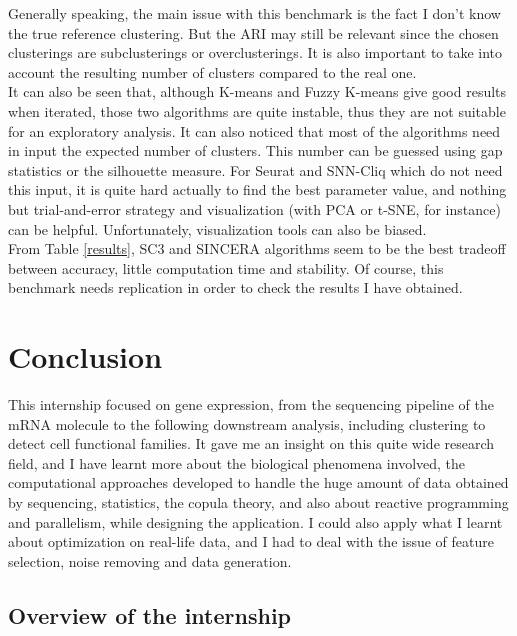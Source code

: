 \documentclass{report}
\begin{document}
Generally speaking, the main issue with this benchmark is the fact I don't know the true reference clustering. But the ARI may still be relevant since the chosen clusterings are subclusterings or overclusterings. It is also important to take into account the resulting number of clusters compared to the real one.\\

It can also be seen that, although K-means and Fuzzy K-means give good results when iterated, those two algorithms are quite instable, thus they are not suitable for an exploratory analysis. It can also noticed that most of the algorithms need in input the expected number of clusters. This number can be guessed using gap statistics\cite{hastie2001estimating} or the silhouette measure\cite{rousseeuw1987silhouettes}. For Seurat and SNN-Cliq which do not need this input, it is quite hard actually to find the best parameter value, and nothing but trial-and-error strategy and visualization (with PCA or t-SNE, for instance) can be helpful. Unfortunately, visualization tools can also be biased\cite{wattenberg2016how}.\\

From Table \ref{results}, SC3 and SINCERA algorithms seem to be the best tradeoff between accuracy, little computation time and stability. Of course, this benchmark needs replication in order to check the results I have obtained.

\chapter{Conclusion}

This internship focused on gene expression, from the sequencing pipeline of the mRNA molecule to the following downstream analysis, including clustering to detect cell functional families. It gave me an insight on this quite wide research field, and I have learnt more about the biological phenomena involved, the computational approaches developed to handle the huge amount of data obtained by sequencing, statistics, the copula theory, and also about reactive programming and parallelism, while designing the application. I could also apply what I learnt about optimization on real-life data, and I had to deal with the issue of feature selection, noise removing and data generation.

\section{Overview of the internship}
\end{document}
